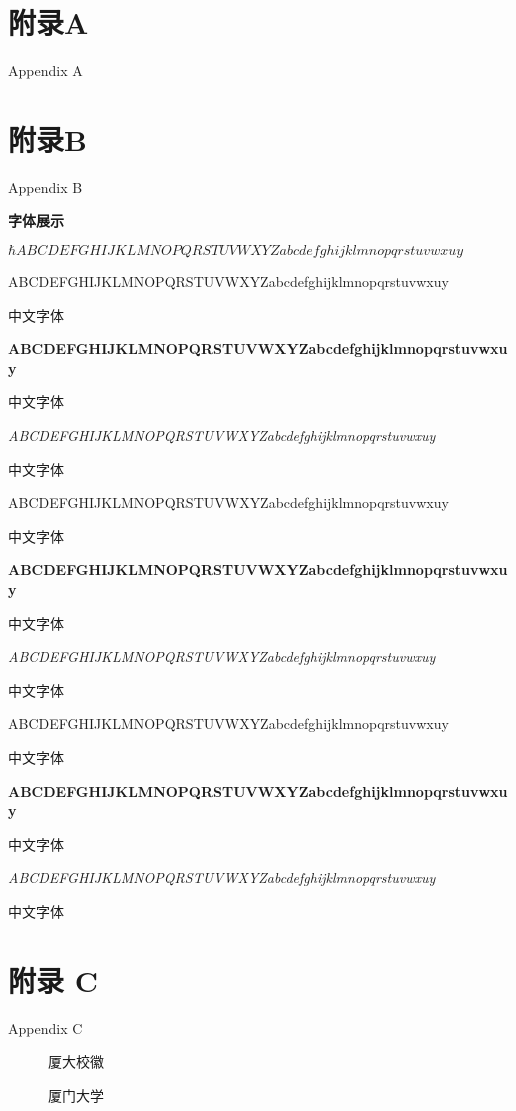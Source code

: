 \documentclass[bibstyle=super,font=empty]{Settings/XMUthesis}
\begin{document}
\frontmatter\xiaosi
\maketitle
%



\xmutableofcontents
\mainmatter%
\pagestyle{fancy}


\backmatter
\nocite{*} 


\chapter{附录A}{Appendix A}

\chapter{附录B}{Appendix B}

\begin{center}
\textbf{字体展示}
\end{center}

\( \hbar ABCDEFGHIJKLMNOPQRSTUVWXYZabcdefghijklmnopqrstuvwxuy \)


 ABCDEFGHIJKLMNOPQRSTUVWXYZabcdefghijklmnopqrstuvwxuy 
 
 中文字体

{\bfseries ABCDEFGHIJKLMNOPQRSTUVWXYZabcdefghijklmnopqrstuvwxuy 
 
 中文字体}

\itshape ABCDEFGHIJKLMNOPQRSTUVWXYZabcdefghijklmnopqrstuvwxuy 
 
 中文字体

\sffamily ABCDEFGHIJKLMNOPQRSTUVWXYZabcdefghijklmnopqrstuvwxuy 

中文字体

\bfseries ABCDEFGHIJKLMNOPQRSTUVWXYZabcdefghijklmnopqrstuvwxuy 
 
 中文字体
\newpage

\itshape ABCDEFGHIJKLMNOPQRSTUVWXYZabcdefghijklmnopqrstuvwxuy 
 
 中文字体

\ttfamily ABCDEFGHIJKLMNOPQRSTUVWXYZabcdefghijklmnopqrstuvwxuy 

中文字体

\bfseries ABCDEFGHIJKLMNOPQRSTUVWXYZabcdefghijklmnopqrstuvwxuy 
 
 中文字体

\itshape ABCDEFGHIJKLMNOPQRSTUVWXYZabcdefghijklmnopqrstuvwxuy 
 
 中文字体

\chapter{附录 C}{Appendix C}
\begin{figure}[htbp!]
\centering
\caption{厦大校徽}
\xmulogo[0.75]
\end{figure}
\begin{figure}[htbp!]
\centering
\caption{厦门大学}
\xmulogon[0.75]
\end{figure}
\end{document}
